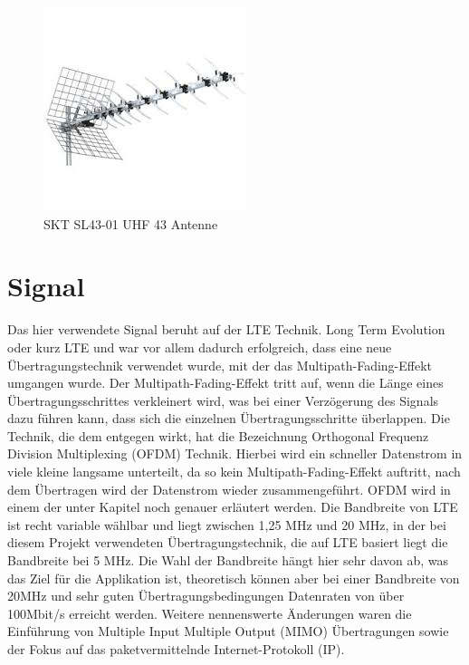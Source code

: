 \begin{figure}
    \centering
    \includegraphics[width=\textwidth]{images/antenne.png}
    \caption{SKT SL43-01 UHF 43 Antenne}\label{fig:antenne}
\end{figure}

\section{Signal}
Das hier verwendete Signal beruht auf der LTE Technik. Long Term Evolution oder kurz LTE und war vor allem dadurch erfolgreich, dass eine neue Übertragungstechnik verwendet wurde, mit der das Multipath-Fading-Effekt umgangen wurde. Der Multipath-Fading-Effekt tritt auf, wenn die Länge eines Übertragungsschrittes verkleinert wird, was bei einer Verzögerung des Signals dazu führen kann, dass sich die einzelnen Übertragungsschritte überlappen. Die Technik, die dem entgegen wirkt, hat die Bezeichnung Orthogonal Frequenz Division Multiplexing (OFDM) Technik. Hierbei wird ein schneller Datenstrom in viele kleine langsame unterteilt, da so kein Multipath-Fading-Effekt auftritt, nach dem Übertragen wird der Datenstrom wieder zusammengeführt. OFDM wird in einem der unter Kapitel noch genauer erläutert werden. Die Bandbreite von LTE ist recht variable wählbar und liegt zwischen 1,25 MHz und 20 MHz, in der bei diesem Projekt verwendeten Übertragungstechnik, die auf LTE basiert liegt die Bandbreite bei 5 MHz. Die Wahl der Bandbreite hängt hier sehr davon ab, was das Ziel für die Applikation ist, theoretisch können aber bei einer Bandbreite von 20MHz und sehr guten Übertragungsbedingungen Datenraten von über 100Mbit/s erreicht werden. Weitere nennenswerte Änderungen waren die Einführung von Multiple Input Multiple Output (MIMO) Übertragungen sowie der Fokus auf das paketvermittelnde Internet-Protokoll (IP).~\cite[S.205f]{Sauter2018}

